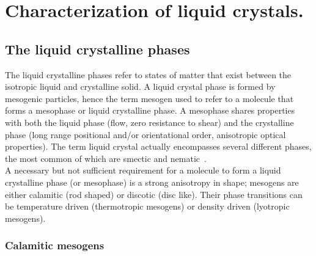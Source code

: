 
\section{Characterization of liquid crystals.}



\subsection{The liquid crystalline phases}

The liquid crystalline phases refer to states of matter that exist between the isotropic liquid and
crystalline solid. A liquid crystal phase is formed by mesogenic particles, hence the term
mesogen used to refer to a molecule that forms a meso\-phase or liquid crystalline phase. A mesophase 
shares properties with both the liquid phase (flow, zero resistance to shear) and the
crystalline phase (long range positional and/or orientational order, anisotropic optical properties).
The term liquid crystal actually encompasses several different phases, the most common of which are
smectic and nematic~\cite{LiquidCrystals, Nature_phase, Intro_LC}.\\
A necessary but not sufficient requirement for a molecule to form a liquid crystalline 
phase (or mesophase) is a strong anisotropy in shape; mesogens are either
calamitic (rod shaped) or discotic (disc like). Their phase transitions can be temperature
driven (thermotropic mesogens) or density driven (lyotropic mesogens).

\subsubsection{Calamitic mesogens}

